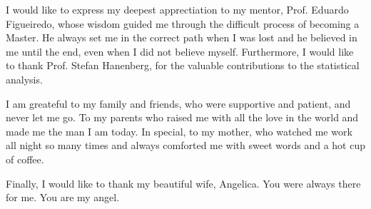 I would like to express my deepest apprectiation to my mentor, Prof. Eduardo Figueiredo, whose wisdom guided me through the difficult process of becoming a Master. He always set me in the correct path when I was lost and he believed in me until the end, even when I did not believe myself. Furthermore, I would like to thank Prof. Stefan Hanenberg, for the valuable contributions to the statistical analysis.

I am greateful to my family and friends, who were supportive and patient, and never let me go. To my parents who raised me with all the love in the world and made me the man I am today. In special, to my mother, who watched me work all night so many times and always comforted me with sweet words and a hot cup of coffee.

Finally, I would like to thank my beautiful wife, Angelica. You were always there for me. You are my angel.